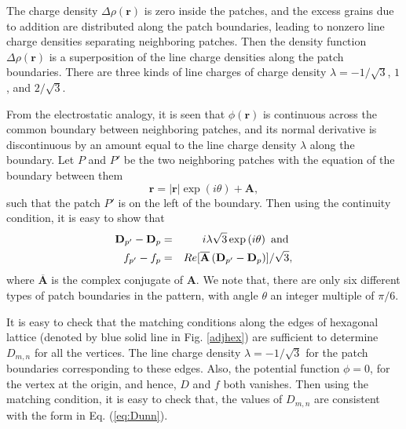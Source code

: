 \documentclass[11pt,a4paper]{book}
\begin{document}
The charge density $\Delta\rho\left( \mathbf{r} \right)$ is zero
inside the patches, and the excess grains due to addition are
distributed along the patch
boundaries, leading to nonzero line charge densities separating
neighboring patches. Then the density function $\Delta\rho\left(
\mathbf{r}
\right)$ is
a superposition of the line charge densities along the patch
boundaries. There are three kinds of line charges of charge density
$\lambda=-1/\sqrt{3}$, $1$, and $2/\sqrt{3}$.

From the electrostatic analogy, it is seen that $\phi\left(
\mathbf{r} \right)$ is
continuous across the common boundary between neighboring patches, and
its normal derivative is discontinuous by an amount equal to the line
charge density $\lambda$ along the boundary. Let $P$ and $P'$ be the two
neighboring patches with the equation of the boundary between them
\begin{equation}
\mathbf{r}=|\mathbf{r}| \exp\left( i \theta \right)+\mathbf{A},
\end{equation}
such that the patch $P'$ is on the left of the boundary.
Then using the continuity condition, it is easy to show that
\begin{eqnarray}
\mathbf{D}_{p'}-\mathbf{D}_{p}&=& i\lambda\sqrt{3} \exp\left( i\theta \right) \rm{~and~} \nonumber \\
f_{p'}-f_{p}&=&Re[\overline{\mathbf{A}}\left( \mathbf{D}_{p'}-\mathbf{D}_{p} \right)]/\sqrt{3},
\label{eq:bc}
\end{eqnarray}
where $\overline{\mathbf{A}}$ is the complex conjugate of $\mathbf{A}$.
We note that, there are only six different types of patch boundaries in the pattern, with angle $\theta$
an integer multiple of $\pi/6$.

It is easy to check that the matching conditions along the edges of hexagonal lattice
(denoted by blue solid line in Fig. \ref{adjhex}) are sufficient to
determine $D_{m,n}$ for
all the vertices. The line charge density $\lambda=-1/\sqrt{3}$ for
the patch boundaries corresponding
to these edges. 
Also, the potential function $\phi=0$, for the vertex at the origin, and
hence, $D$ and $f$ both vanishes.
Then using the matching condition, it is easy to check that, the values
of $D_{m,n}$ are consistent with the form in Eq. (\ref{eq:Dunn}).
\end{document}
